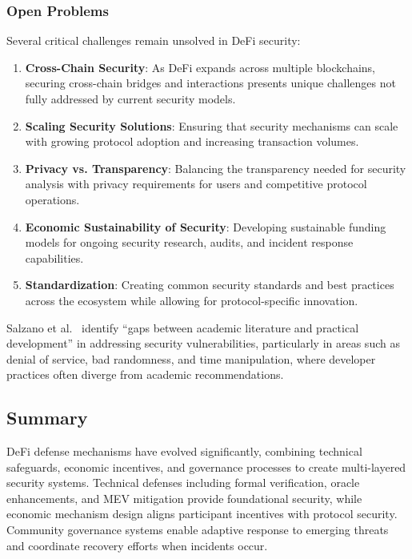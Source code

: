 \documentclass[conference]{IEEEtran}
\begin{document}
    \subsubsection{Open Problems}
    Several critical challenges remain unsolved in DeFi security:
    \begin{enumerate}
        \item \textbf{Cross-Chain Security}: As DeFi expands across multiple blockchains, securing cross-chain bridges and interactions presents unique challenges not fully addressed by current security models.
        
        \item \textbf{Scaling Security Solutions}: Ensuring that security mechanisms can scale with growing protocol adoption and increasing transaction volumes.
        
        \item \textbf{Privacy vs. Transparency}: Balancing the transparency needed for security analysis with privacy requirements for users and competitive protocol operations.
        
        \item \textbf{Economic Sustainability of Security}: Developing sustainable funding models for ongoing security research, audits, and incident response capabilities.
        
        \item \textbf{Standardization}: Creating common security standards and best practices across the ecosystem while allowing for protocol-specific innovation.
    \end{enumerate}

    Salzano et al.~\cite{salzano2025bridging} identify ``gaps between academic literature and practical development'' in addressing security vulnerabilities, particularly in areas such as denial of service, bad randomness, and time manipulation, where developer practices often diverge from academic recommendations.

\subsection{Summary}
    DeFi defense mechanisms have evolved significantly, combining technical safeguards, economic incentives, and governance processes to create multi-layered security systems. Technical defenses including formal verification, oracle enhancements, and MEV mitigation provide foundational security, while economic mechanism design aligns participant incentives with protocol security. Community governance systems enable adaptive response to emerging threats and coordinate recovery efforts when incidents occur.
\end{document}
